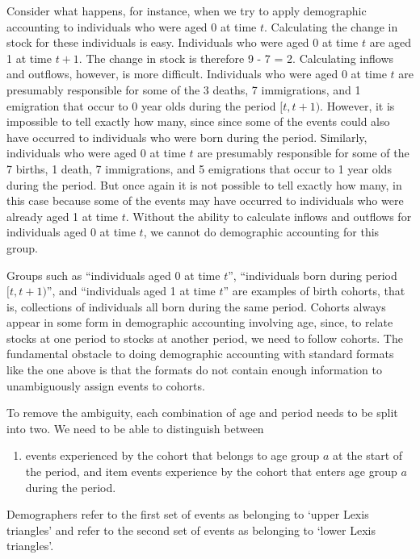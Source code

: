\documentclass[USenglish]{article}
\begin{document}
Consider what happens, for instance, when we try to apply demographic accounting to individuals who were aged 0 at time $t$. Calculating the change in stock for these individuals is easy. Individuals who were aged 0 at time $t$ are aged 1 at time $t+1$. The change in stock is therefore 9 - 7 = 2. Calculating inflows and outflows, however, is more difficult. Individuals who were aged 0 at time $t$ are presumably responsible for some of the 3 deaths, 7 immigrations, and 1 emigration that occur to 0 year olds during the period $[t,t+1)$. However, it is impossible to tell exactly how many, since since some of the events could also have occurred to individuals who were born during the period. Similarly, individuals who were aged 0 at time $t$ are presumably responsible for some of the 7 births, 1 death, 7 immigrations, and 5 emigrations that occur to 1 year olds during the period. But once again it is not possible to tell exactly how many, in this case because some of the events may have occurred to individuals who were already aged 1 at time $t$.
Without the ability to calculate inflows and outflows for individuals aged 0 at time $t$, we cannot do demographic accounting for this group.

Groups such as ``individuals aged 0 at time $t$'', ``individuals born during period $[t, t+1)$'', and ``individuals aged 1 at time $t$'' are examples of birth cohorts, that is, collections of individuals all born during the same period. Cohorts always appear in some form in demographic accounting involving age, since, to relate stocks at one period to stocks at another period, we need to follow cohorts. The fundamental obstacle to doing demographic accounting with standard formats like the one above is that the formats do not contain enough information to unambiguously assign events to cohorts.

To remove the ambiguity, each combination of age and period needs to be split into two. We need to be able to distinguish between
\begin{enumerate}
    \item events experienced by the cohort that belongs to age group $a$ at the start of the period, and
    item events experience by the cohort that enters age group $a$ during the period.
\end{enumerate}
Demographers refer to the first set of events as belonging to `upper Lexis triangles' and refer to the second set of events as belonging to `lower Lexis triangles'.
\end{document}
